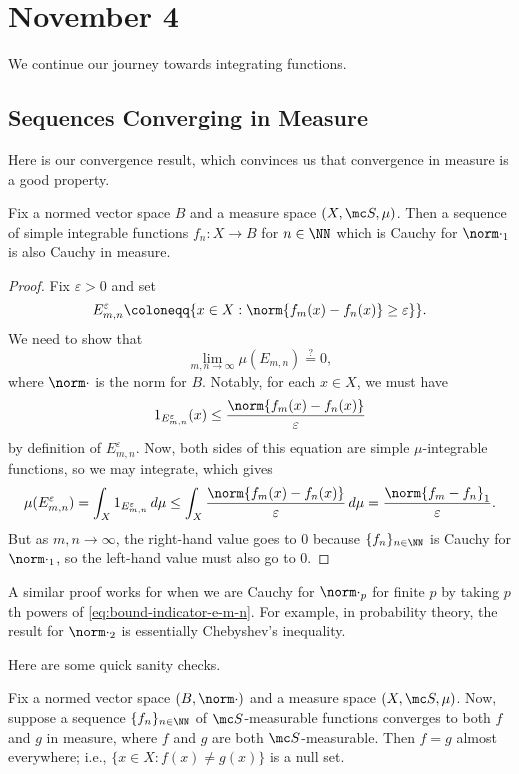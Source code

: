 \documentclass[../notes.tex]{subfiles}
\begin{document}
\section{November 4}

We continue our journey towards integrating functions.

\subsection{Sequences Converging in Measure}
Here is our convergence result, which convinces us that convergence in measure is a good property.
\begin{proposition}
	Fix a normed vector space $B$ and a measure space $(X,\mc S,\mu)$. Then a sequence of simple integrable functions $f_n\colon X\to B$ for $n\in\NN$ which is Cauchy for $\norm\cdot_1$ is also Cauchy in measure.
\end{proposition}
\begin{proof}
	Fix $\varepsilon>0$ and set
	\[E^\varepsilon_{m,n}\coloneqq\{x\in X:\norm{f_m(x)-f_n(x)}\ge\varepsilon\}\}.\]
	We need to show that
	\[\lim_{m,n\to\infty}\mu(E_{m,n})\stackrel?=0,\]
	where $\norm\cdot$ is the norm for $B$. Notably, for each $x\in X$, we must have
	\begin{equation}
		1_{E^\varepsilon_{m,n}}(x)\le\frac{\norm{f_m(x)-f_n(x)}}\varepsilon \label{eq:bound-indicator-e-m-n}
	\end{equation}
	by definition of $E^{\varepsilon}_{m,n}$. Now, both sides of this equation are simple $\mu$-integrable functions, so we may integrate, which gives
	\[\mu(E^\varepsilon_{m,n})=\int_X1_{E^{\varepsilon}_{m,n}}\,d\mu\le\int_X\frac{\norm{f_m(x)-f_n(x)}}\varepsilon\,d\mu=\frac{\norm{f_m-f_n}_1}\varepsilon.\]
	But as $m,n\to\infty$, the right-hand value goes to $0$ because $\{f_n\}_{n\in\NN}$ is Cauchy for $\norm\cdot_1$, so the left-hand value must also go to $0$.
\end{proof}
\begin{remark}
	A similar proof works for when we are Cauchy for $\norm\cdot_p$ for finite $p$ by taking $p$th powers of \autoref{eq:bound-indicator-e-m-n}. For example, in probability theory, the result for $\norm\cdot_2$ is essentially Chebyshev's inequality.
\end{remark}
Here are some quick sanity checks.
\begin{lemma} \label{lem:converge-in-measure-uniq-ae}
	Fix a normed vector space $(B,\norm\cdot)$ and a measure space $(X,\mc S,\mu)$. Now, suppose a sequence $\{f_n\}_{n\in\NN}$ of $\mc S$-measurable functions converges to both $f$ and $g$ in measure, where $f$ and $g$ are both $\mc S$-measurable. Then $f=g$ almost everywhere; i.e., $\{x\in X:f(x)\ne g(x)\}$ is a null set.
\end{lemma}
\end{document}
